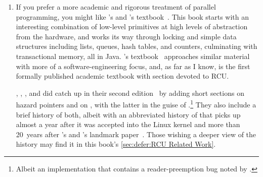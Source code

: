\begin{enumerate}
\item	If you prefer a more academic and rigorous treatment of
	parallel programming,
	you might like 's and 's
	textbook~\cite{HerlihyShavit2008Textbook,HerlihyShavit2020Textbook}.
	This book starts with an interesting combination
	of low-level primitives at high levels of abstraction
	from the hardware, and works its way through locking
	and simple data structures including lists, queues,
	hash tables, and counters, culminating with transactional
	memory, all in Java.
	's textbook~\cite{MichaelScott2013Textbook}
	approaches similar material with more of a
	software-engineering focus, and, as far as I know, is
	the first formally published academic textbook with
	section devoted to RCU\@.

	, ,
	, and  did
	catch up in their second edition~\cite{HerlihyShavit2020Textbook}
	by adding short sections on hazard pointers and on ,
	with the latter in the guise of \@.\footnote{
		Albeit an implementation that contains a reader-preemption
		bug noted by .}
	They also include a brief history of both, albeit with an
	abbreviated history of  that picks up almost a year after
	it was accepted into the Linux kernel and more than 20~years
	after 's and 's
	landmark paper~\cite{Kung80}.
	Those wishing a deeper view of the history may find it in
	this book's \cref{sec:defer:RCU Related Work}.


\end{enumerate}
